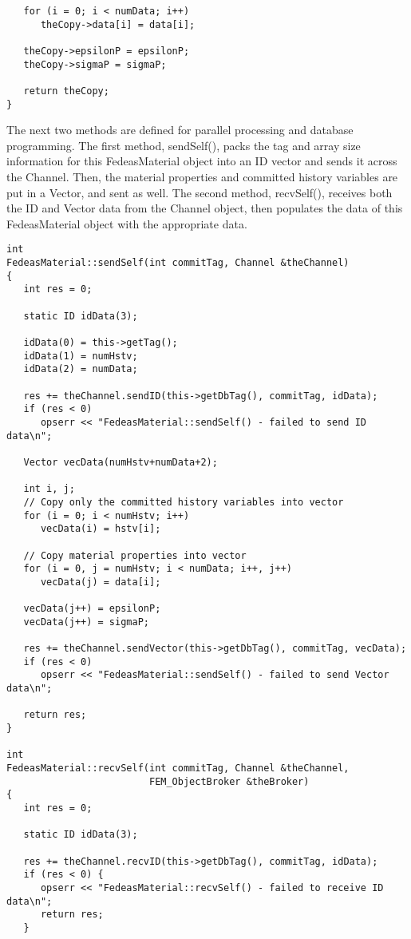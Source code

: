 \documentclass[12pt]{article}
\begin{document}
{{\begin{verbatim}
   for (i = 0; i < numData; i++)
      theCopy->data[i] = data[i];
     
   theCopy->epsilonP = epsilonP;
   theCopy->sigmaP = sigmaP;
     
   return theCopy;
}
\end{verbatim}
}

\noindent The next two methods are defined for parallel processing and database programming.
The first method, sendSelf(), packs the tag and array size information for this FedeasMaterial
object into an ID vector and sends it across the Channel. Then, the material properties and 
committed history variables are put in a Vector, and sent as well.
The second method, recvSelf(), receives both the ID and Vector data from the Channel object, 
then populates the data of this FedeasMaterial object with the appropriate data.

{\sf\small
\begin{verbatim}
int 
FedeasMaterial::sendSelf(int commitTag, Channel &theChannel)
{
   int res = 0;
     
   static ID idData(3);
     
   idData(0) = this->getTag();
   idData(1) = numHstv;
   idData(2) = numData;
     
   res += theChannel.sendID(this->getDbTag(), commitTag, idData);
   if (res < 0) 
      opserr << "FedeasMaterial::sendSelf() - failed to send ID data\n";
     
   Vector vecData(numHstv+numData+2);
     
   int i, j;
   // Copy only the committed history variables into vector
   for (i = 0; i < numHstv; i++)
      vecData(i) = hstv[i];
     
   // Copy material properties into vector
   for (i = 0, j = numHstv; i < numData; i++, j++)
      vecData(j) = data[i];
     
   vecData(j++) = epsilonP;
   vecData(j++) = sigmaP;
     
   res += theChannel.sendVector(this->getDbTag(), commitTag, vecData);
   if (res < 0) 
      opserr << "FedeasMaterial::sendSelf() - failed to send Vector data\n";
     
   return res;
}

int
FedeasMaterial::recvSelf(int commitTag, Channel &theChannel,
                         FEM_ObjectBroker &theBroker)
{
   int res = 0;
     
   static ID idData(3);
     
   res += theChannel.recvID(this->getDbTag(), commitTag, idData);
   if (res < 0) {
      opserr << "FedeasMaterial::recvSelf() - failed to receive ID data\n";
      return res;
   }
     

\end{verbatim}}}
\end{document}
